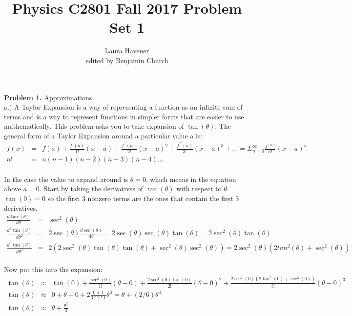 \documentclass[11pt]{amsart}
\title{Physics C2801 Fall 2017 Problem Set 1}
\author{Laura Havener \\ edited by Benjamin Church}
\begin{document}
\maketitle

\textbf{Problem 1.} Approximations \\ 

a.) A Taylor Expansion is a way of representing a function as an infinite sum of terms and is a way to represent functions in simpler forms that are easier to use mathematically. This problem asks you to take expansion of $\tan(\theta)$. The general form of a Taylor Expansion around a particular value a is:\\ 
\begin{eqnarray}
f(x) &=& f(a)+\frac{f^{'}(a)}{1!} (x-a)+\frac{f^{''}(a)}{2!}(x-a)^{2}+\frac{f^{'''}(a)}{3!}(x-a)^{3}+...=\Sigma^{\infty}_{n=0} \frac{f^{(n)}}{n!}(x-a)^{n} \nonumber \\
n! &=& n(n-1)(n-2)(n-3)(n-4)... \nonumber
\end{eqnarray} \\
In the case the value to expand around is $\theta=0$, which means in the equation above $a=0$. Start by taking the derivatives of $\tan(\theta)$ with respect to $\theta$. $\tan(0)=0$ so the first 3 nonzero terms are the ones that contain the first 3 derivatives. \\
\begin{eqnarray}
\frac{d\tan(\theta)}{d\theta} &=& \sec^{2}(\theta) \nonumber \\
\frac{d^{2}\tan(\theta)}{d\theta^{2}} &=& 2\sec(\theta)\frac{d\sec(\theta)}{d\theta} = 2\sec(\theta)\sec(\theta)\tan(\theta) = 2\sec^{2}(\theta)\tan(\theta) \nonumber \\
\frac{d^{3}\tan(\theta)}{d\theta^{3}} &=& 2(2\sec^{2}(\theta)\tan(\theta)\tan(\theta) + \sec^{2}(\theta)\sec^{2}(\theta)) = 2\sec^{2}(\theta)(2tan^{2}(\theta) + \sec^{2}(\theta)) \nonumber 
\end{eqnarray} \\
Now put this into the expansion: \\
\begin{eqnarray} 
\tan(\theta) &\approx& \tan(0) + \frac{\sec^{2}(0)}{1!}(\theta-0) + \frac{2\sec^{2}(0)\tan(0)}{2!}(\theta-0)^{2} + \frac{2\sec^{2}(0)(2\tan^{2}(0) + \sec^{2}(0))}{3!}(\theta-0)^{3} \nonumber \\
\tan(\theta) &\approx& 0 + \theta + 0 + 2\frac{0 + 1}{3*2*1}\theta^{3} = \theta + (2/6)\theta^{3} \nonumber \\
\tan(\theta) &\approx& \theta + \frac{\theta^{3}}{3} \nonumber 
\end{eqnarray}  \\
\end{document}
